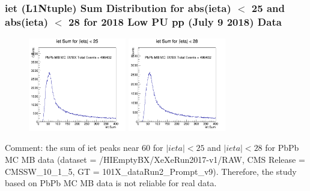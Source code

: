 \documentclass{beamer}
\begin{document}
\begin{frame}
\frametitle{iet (L1Ntuple) Sum Distribution for abs(ieta) $<$ 25 and abs(ieta) $<$ 28 for 2018 Low PU pp (July 9 2018) Data} 

\begin{figure}
\includegraphics[width=0.38\textwidth]{Plots/PbPb/iETSumHisLT25.png}
\includegraphics[width=0.38\textwidth]{Plots/PbPb/iETSumHisLT28.png}
\end{figure}


\begin{block}
{Comment: the sum of iet peaks near 60 for $|ieta| < 25$ and $|ieta| < 28$ for PbPb MC MB data (dataset = /HIEmptyBX/XeXeRun2017-v1/RAW, CMS Release = CMSSW\_10\_1\_5, GT = 101X\_dataRun2\_Prompt\_v9). Therefore, the study based on PbPb MC MB data is not reliable for real data.}
\end{block}
\end{frame}
\end{document}
